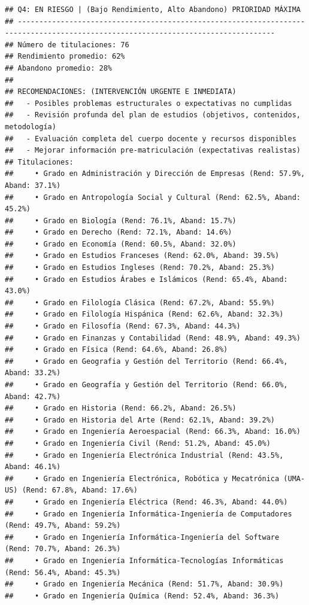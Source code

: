\documentclass[
]{article}
\begin{document}
\begin{verbatim}
## Q4: EN RIESGO | (Bajo Rendimiento, Alto Abandono) PRIORIDAD MÁXIMA
## ---------------------------------------------------------------------------------------------------------------------------------- 
## Número de titulaciones: 76 
## Rendimiento promedio: 62% 
## Abandono promedio: 28% 
## 
## RECOMENDACIONES: (INTERVENCIÓN URGENTE E INMEDIATA)
##   - Posibles problemas estructurales o expectativas no cumplidas
##   - Revisión profunda del plan de estudios (objetivos, contenidos, metodología)
##   - Evaluación completa del cuerpo docente y recursos disponibles
##   - Mejorar información pre-matriculación (expectativas realistas)
## Titulaciones:
##     • Grado en Administración y Dirección de Empresas (Rend: 57.9%, Aband: 37.1%)
##     • Grado en Antropología Social y Cultural (Rend: 62.5%, Aband: 45.2%)
##     • Grado en Biología (Rend: 76.1%, Aband: 15.7%)
##     • Grado en Derecho (Rend: 72.1%, Aband: 14.6%)
##     • Grado en Economía (Rend: 60.5%, Aband: 32.0%)
##     • Grado en Estudios Franceses (Rend: 62.0%, Aband: 39.5%)
##     • Grado en Estudios Ingleses (Rend: 70.2%, Aband: 25.3%)
##     • Grado en Estudios Árabes e Islámicos (Rend: 65.4%, Aband: 43.0%)
##     • Grado en Filología Clásica (Rend: 67.2%, Aband: 55.9%)
##     • Grado en Filología Hispánica (Rend: 62.6%, Aband: 32.3%)
##     • Grado en Filosofía (Rend: 67.3%, Aband: 44.3%)
##     • Grado en Finanzas y Contabilidad (Rend: 48.9%, Aband: 49.3%)
##     • Grado en Física (Rend: 64.6%, Aband: 26.8%)
##     • Grado en Geografia y Gestión del Territorio (Rend: 66.4%, Aband: 33.2%)
##     • Grado en Geografía y Gestión del Territorio (Rend: 66.0%, Aband: 42.7%)
##     • Grado en Historia (Rend: 66.2%, Aband: 26.5%)
##     • Grado en Historia del Arte (Rend: 62.1%, Aband: 39.2%)
##     • Grado en Ingeniería Aeroespacial (Rend: 66.3%, Aband: 16.0%)
##     • Grado en Ingeniería Civil (Rend: 51.2%, Aband: 45.0%)
##     • Grado en Ingeniería Electrónica Industrial (Rend: 43.5%, Aband: 46.1%)
##     • Grado en Ingeniería Electrónica, Robótica y Mecatrónica (UMA-US) (Rend: 67.8%, Aband: 17.6%)
##     • Grado en Ingeniería Eléctrica (Rend: 46.3%, Aband: 44.0%)
##     • Grado en Ingeniería Informática-Ingeniería de Computadores (Rend: 49.7%, Aband: 59.2%)
##     • Grado en Ingeniería Informática-Ingeniería del Software (Rend: 70.7%, Aband: 26.3%)
##     • Grado en Ingeniería Informática-Tecnologías Informáticas (Rend: 56.4%, Aband: 45.3%)
##     • Grado en Ingeniería Mecánica (Rend: 51.7%, Aband: 30.9%)
##     • Grado en Ingeniería Química (Rend: 52.4%, Aband: 36.3%)

\end{verbatim}
\end{document}
